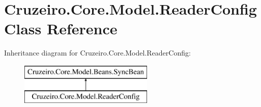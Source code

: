 \hypertarget{class_cruzeiro_1_1_core_1_1_model_1_1_reader_config}{}\section{Cruzeiro.\+Core.\+Model.\+Reader\+Config Class Reference}
\label{class_cruzeiro_1_1_core_1_1_model_1_1_reader_config}
Inheritance diagram for Cruzeiro.\+Core.\+Model.\+Reader\+Config\+:\begin{figure}[H]
\begin{center}
\leavevmode
\includegraphics[height=2.000000cm]{class_cruzeiro_1_1_core_1_1_model_1_1_reader_config}
\end{center}
\end{figure}
